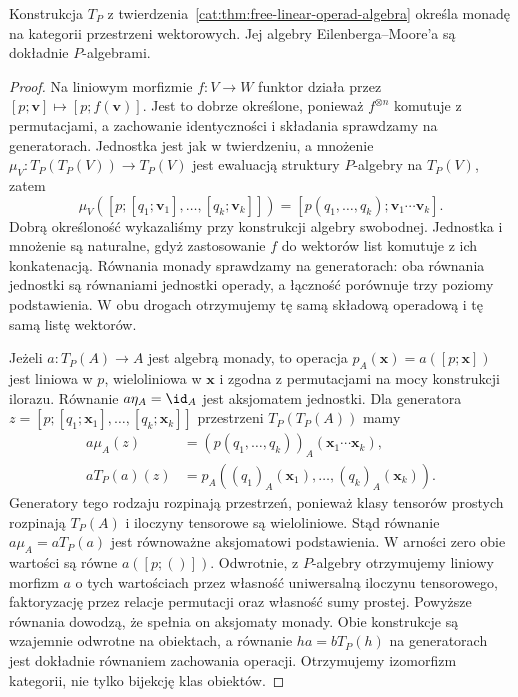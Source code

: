 \begin{stwierdzenie}\label{cat:prop:linear-operad-monad}
Konstrukcja $T_P$ z twierdzenia~\ref{cat:thm:free-linear-operad-algebra} określa monadę na kategorii przestrzeni wektorowych. Jej algebry Eilenberga--Moore'a są dokładnie $P$-algebrami.
\end{stwierdzenie}
\begin{proof}
Na liniowym morfizmie $f:V\to W$ funktor działa przez $[p;\mathbf v]\mapsto[p;f(\mathbf v)]$. Jest to dobrze określone, ponieważ $f^{\otimes n}$ komutuje z permutacjami, a zachowanie identyczności i składania sprawdzamy na generatorach. Jednostka jest jak w twierdzeniu, a mnożenie $\mu_V:T_P(T_P(V))\to T_P(V)$ jest ewaluacją struktury $P$-algebry na $T_P(V)$, zatem
\[
 \mu_V([p;[q_1;\mathbf v_1],\ldots,[q_k;\mathbf v_k]])
 =[p(q_1,\ldots,q_k);\mathbf v_1\cdots\mathbf v_k].
\]
Dobrą określoność wykazaliśmy przy konstrukcji algebry swobodnej. Jednostka i mnożenie są naturalne, gdyż zastosowanie $f$ do wektorów list komutuje z ich konkatenacją. Równania monady sprawdzamy na generatorach: oba równania jednostki są równaniami jednostki operady, a łączność porównuje trzy poziomy podstawienia. W obu drogach otrzymujemy tę samą składową operadową i tę samą listę wektorów.

Jeżeli $a:T_P(A)\to A$ jest algebrą monady, to operacja $p_A(\mathbf x)=a([p;\mathbf x])$ jest liniowa w $p$, wieloliniowa w $\mathbf x$ i zgodna z permutacjami na mocy konstrukcji ilorazu. Równanie $a\eta_A=\id_A$ jest aksjomatem jednostki. Dla generatora $z=[p;[q_1;\mathbf x_1],\ldots,[q_k;\mathbf x_k]]$ przestrzeni $T_P(T_P(A))$ mamy
\[
\begin{aligned}
 a\mu_A(z)&=(p(q_1,\ldots,q_k))_A(\mathbf x_1\cdots\mathbf x_k),\\
 aT_P(a)(z)&=p_A((q_1)_A(\mathbf x_1),\ldots,(q_k)_A(\mathbf x_k)).
\end{aligned}
\]
Generatory tego rodzaju rozpinają przestrzeń, ponieważ klasy tensorów prostych rozpinają $T_P(A)$ i iloczyny tensorowe są wieloliniowe. Stąd równanie $a\mu_A=aT_P(a)$ jest równoważne aksjomatowi podstawienia. W arności zero obie wartości są równe $a([p;()])$. Odwrotnie, z $P$-algebry otrzymujemy liniowy morfizm $a$ o tych wartościach przez własność uniwersalną iloczynu tensorowego, faktoryzację przez relacje permutacji oraz własność sumy prostej. Powyższe równania dowodzą, że spełnia on aksjomaty monady. Obie konstrukcje są wzajemnie odwrotne na obiektach, a równanie $ha=bT_P(h)$ na generatorach jest dokładnie równaniem zachowania operacji. Otrzymujemy izomorfizm kategorii, nie tylko bijekcję klas obiektów.
\end{proof}

